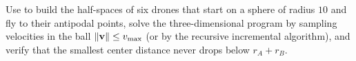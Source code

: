 \begin{exercise}
\label{exr:ch13-3d}
Use  to build the half-spaces of six drones that
start on a sphere of radius $10$ and fly to their antipodal points, solve
the three-dimensional program by sampling velocities in the ball
$\left\lVert \mathbf{v} \right\rVert \le v_{\max}$ (or by the recursive incremental algorithm), and
verify that the smallest center distance never drops below $r_A + r_B$.
\end{exercise}
